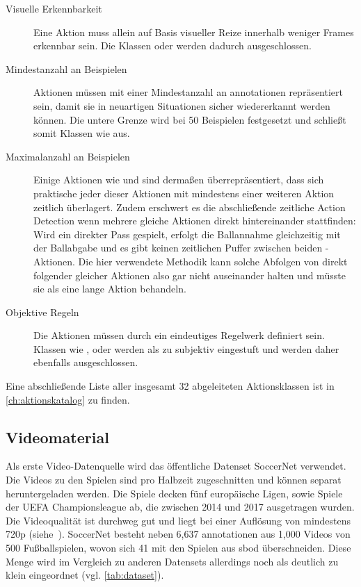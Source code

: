\begin{description}
    \item[Visuelle Erkennbarkeit] Eine Aktion muss allein auf Basis visueller Reize innerhalb weniger Frames erkennbar sein.
    Die Klassen  oder  werden dadurch ausgeschlossen.
    \item[Mindestanzahl an Beispielen] Aktionen müssen mit einer Mindestanzahl an \gls{annotationen} repräsentiert sein, damit sie in neuartigen Situationen sicher wiedererkannt werden können.
    Die untere Grenze wird bei 50 Beispielen festgesetzt und schließt somit Klassen wie  aus.
    \item[Maximalanzahl an Beispielen] Einige Aktionen wie  und  sind dermaßen überrepräsentiert, dass sich praktische jeder dieser Aktionen mit mindestens einer weiteren Aktion zeitlich überlagert.
    Zudem erschwert es die abschließende zeitliche Action Detection wenn mehrere gleiche Aktionen direkt hintereinander stattfinden:
    Wird \zB ein direkter Pass gespielt, erfolgt die Ballannahme gleichzeitig mit der Ballabgabe und es gibt keinen zeitlichen Puffer zwischen beiden -Aktionen.
    Die hier verwendete Methodik kann solche Abfolgen von direkt folgender gleicher Aktionen also gar nicht auseinander halten und müsste sie als eine lange Aktion behandeln.
    \item[Objektive Regeln] Die Aktionen müssen durch ein eindeutiges Regelwerk definiert sein.
    Klassen wie ,  oder  werden als zu subjektiv eingestuft und werden daher ebenfalls ausgeschlossen.
\end{description}

Eine abschließende Liste aller insgesamt 32 abgeleiteten Aktionsklassen ist in \autoref{ch:aktionskatalog} zu finden.

\subsection{Videomaterial}
\label{subsec:videomaterial}

Als erste Video-Datenquelle wird das öffentliche Datenset SoccerNet verwendet.
Die Videos zu den Spielen sind pro Halbzeit zugeschnitten und können separat heruntergeladen werden.
Die Spiele decken fünf europäische Ligen, sowie Spiele der UEFA Championsleague ab, die zwischen 2014 und 2017 ausgetragen wurden.
Die Videoqualität ist durchweg gut und liegt bei einer Auflösung von mindestens 720p (siehe~\cite{SoccerNet20}).
SoccerNet besteht neben 6,637 \gls{annotationen} aus 1,000 Videos von 500 Fußballspielen, wovon sich 41 mit den Spielen aus \gls{sbod} überschneiden.
Diese Menge wird im Vergleich zu anderen Datensets allerdings noch als deutlich zu klein eingeordnet (vgl. \autoref{tab:dataset}).

